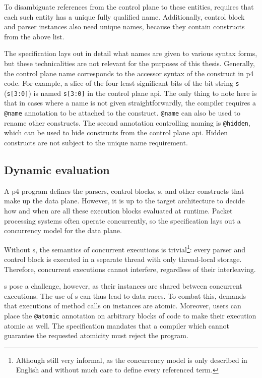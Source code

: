To disambiguate references from the control plane to these entities, \pfs
requires that each such entity has a unique fully qualified name. Additionally,
control block and parser instances also need unique names, because they contain
constructs from the above list.

The \pfs specification lays out in detail what names are given to various syntax
forms, but these technicalities are not relevant for the purposes of this
thesis. Generally, the control plane name corresponds to the accessor syntax of
the construct in \acrshort{p4} code. For example, a slice of the four least
significant bits of the bit string \texttt{s} (\texttt{s[3:0]}) is named
\texttt{s[3:0]} in the control plane \acrshort{api}. The only thing to note here
is that in cases where a name is not given straightforwardly, the compiler
requires a \texttt{@name} annotation to be attached to the construct.
\texttt{@name} can also be used to rename other constructs. The second
annotation controlling naming is \texttt{@hidden}, which can be used to hide
constructs from the control plane \acrshort{api}. Hidden constructs are not
subject to the unique name requirement.

\subsection*{Dynamic evaluation}

A \acrshort{p4} program defines the parsers, control blocks, \extern{}s, and
other constructs that make up the data plane. However, it is up to the target
architecture to decide how and when are all these execution blocks evaluated at
runtime. Packet processing systems often operate concurrently, so the \pfs
specification lays out a concurrency model for the data plane.

Without \extern{}s, the semantics of concurrent executions is
trivial\footnote{Although still very informal, as the concurrency model is only
described in English and without much care to define every referenced term.}:
every parser and control block is executed in a separate thread with only
thread-local storage. Therefore, concurrent executions cannot interfere,
regardless of their interleaving.

\extern{}s pose a challenge, however, as their instances are shared between
concurrent executions. The use of \extern{}s can thus lead to data races. To
combat this, \pfs demands that executions of method calls on \extern{} instances
are atomic. Moreover, users can place the \texttt{@atomic} annotation on
arbitrary blocks of code to make their execution atomic as well. The
specification mandates that a compiler which cannot guarantee the requested
atomicity must reject the program.
